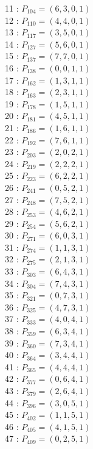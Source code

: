 \documentclass{article}
\begin{document}
{\begin{multicols}{3}
11 : $P_{104}=( 6, 3, 0, 1 )$\\
12 : $P_{110}=( 4, 4, 0, 1 )$\\
13 : $P_{117}=( 3, 5, 0, 1 )$\\
14 : $P_{127}=( 5, 6, 0, 1 )$\\
15 : $P_{137}=( 7, 7, 0, 1 )$\\
16 : $P_{138}=( 0, 0, 1, 1 )$\\
17 : $P_{162}=( 1, 3, 1, 1 )$\\
18 : $P_{163}=( 2, 3, 1, 1 )$\\
19 : $P_{178}=( 1, 5, 1, 1 )$\\
20 : $P_{181}=( 4, 5, 1, 1 )$\\
21 : $P_{186}=( 1, 6, 1, 1 )$\\
22 : $P_{192}=( 7, 6, 1, 1 )$\\
23 : $P_{203}=( 2, 0, 2, 1 )$\\
24 : $P_{219}=( 2, 2, 2, 1 )$\\
25 : $P_{223}=( 6, 2, 2, 1 )$\\
26 : $P_{241}=( 0, 5, 2, 1 )$\\
27 : $P_{248}=( 7, 5, 2, 1 )$\\
28 : $P_{253}=( 4, 6, 2, 1 )$\\
29 : $P_{254}=( 5, 6, 2, 1 )$\\
30 : $P_{271}=( 6, 0, 3, 1 )$\\
31 : $P_{274}=( 1, 1, 3, 1 )$\\
32 : $P_{275}=( 2, 1, 3, 1 )$\\
33 : $P_{303}=( 6, 4, 3, 1 )$\\
34 : $P_{304}=( 7, 4, 3, 1 )$\\
35 : $P_{321}=( 0, 7, 3, 1 )$\\
36 : $P_{325}=( 4, 7, 3, 1 )$\\
37 : $P_{333}=( 4, 0, 4, 1 )$\\
38 : $P_{359}=( 6, 3, 4, 1 )$\\
39 : $P_{360}=( 7, 3, 4, 1 )$\\
40 : $P_{364}=( 3, 4, 4, 1 )$\\
41 : $P_{365}=( 4, 4, 4, 1 )$\\
42 : $P_{377}=( 0, 6, 4, 1 )$\\
43 : $P_{379}=( 2, 6, 4, 1 )$\\
44 : $P_{396}=( 3, 0, 5, 1 )$\\
45 : $P_{402}=( 1, 1, 5, 1 )$\\
46 : $P_{405}=( 4, 1, 5, 1 )$\\
47 : $P_{409}=( 0, 2, 5, 1 )$\\

\end{multicols}}
\end{document}
